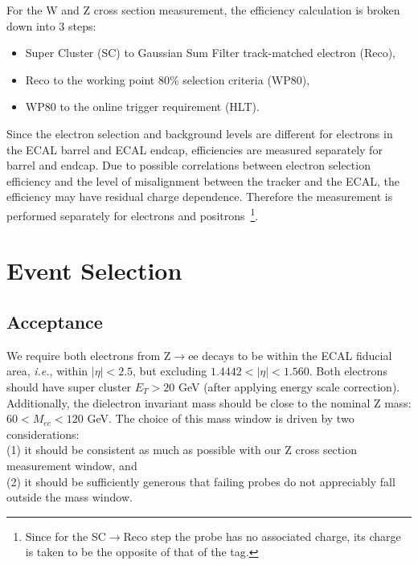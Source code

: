 For the W and Z cross section measurement, the efficiency calculation is broken down into 3 steps: 
\begin{itemize}
\item Super Cluster (SC) to Gaussian Sum Filter track-matched electron (Reco), \\
\item Reco to the working point 80\% selection criteria (WP80), \\
\item WP80 to the online trigger requirement (HLT). 
\end{itemize}
Since the electron selection and background levels are different for electrons in 
the ECAL barrel and ECAL endcap, efficiencies are measured separately for barrel 
and endcap. Due to possible correlations between electron selection efficiency and 
the level of misalignment between the tracker and the ECAL, the efficiency may have 
residual charge dependence. Therefore the measurement is performed separately for 
electrons and positrons~\footnote{Since for the SC$\to$Reco step the probe has no 
associated charge, its charge is taken to be the opposite of that of the tag.}.





\section{Event Selection}
\subsection{Acceptance}
We require both electrons from Z$\to$ee decays to be within the 
ECAL fiducial area, \textit{i.e.}, within $|\eta|<2.5$, but 
excluding $1.4442<|\eta|<1.560$.   
Both electrons should have super cluster $E_T > 20$ GeV (after applying 
energy scale correction). Additionally, the dielectron invariant mass 
should be close to the nominal Z mass: $60<M_{ee}<120$ GeV. 
The choice of this mass window is driven by two considerations: \\ 
(1) it should be consistent as much as possible with our Z cross section 
measurement window, and \\
(2) it should be sufficiently generous that failing probes do not 
appreciably fall outside the mass window. 



